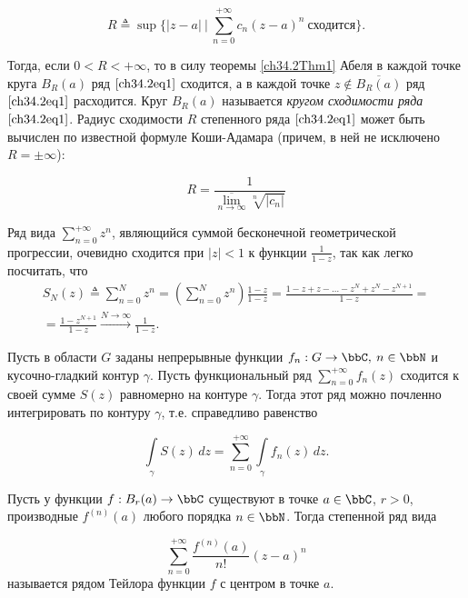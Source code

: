 \begin{equation} \label{ch34.2eq2}
R \triangleq \sup \{ |z - a| \: \big| \: \sum_{n = 0}^{+\infty} c_n (z - a)^n \: \text{сходится} \}.
\end{equation}

Тогда, если $0 < R < +\infty$, то в силу теоремы \ref{ch34.2Thm1} Абеля в каждой точке круга $B_R(a)$ ряд $\eqref{ch34.2eq1}$ сходится, а в каждой точке $z \notin \overline{B_R(a)}$ ряд $\eqref{ch34.2eq1}$ расходится. Круг $B_R(a)$ называется \textit{кругом сходимости ряда} $\eqref{ch34.2eq1}$.
Радиус сходимости $R$ степенного ряда $\eqref{ch34.2eq1}$ может быть вычислен по известной формуле Коши-Адамара (причем, в ней не исключено $R=\pm\infty$):

\begin{equation} \label{ch34.2eq3}
R = \frac{1}{\overline{\lim\limits_{n \to \infty}} \sqrt[n]{|c_n|}}
\end{equation}

\begin{exmpl} \label{exmpl2}
Ряд вида $\sum\limits_{n = 0}^{+\infty} z^n$, являющийся суммой бесконечной геометрической прогрессии, очевидно сходится при $|z| < 1$ к функции $\frac{1}{1 - z}$, так как легко посчитать, что
\begin{multline*}
S_N(z) \triangleq \sum\limits_{n = 0}^{N} z^n = \left( \sum\limits_{n = 0}^{N} z^n \right) \frac{1 - z}{1 - z} =\frac{1-z+z-\dots-z^N+z^N-z^{N+1}}{1-z}=\\= \frac{1 - z^{N + 1}}{1 - z}  \xrightarrow{N \to \infty} \frac{1}{1 - z}.
\end{multline*}

\end{exmpl} 
\begin{stt} \label{ch34stt1000}
Пусть в области $G$ заданы непрерывные функции $f_n: G \to \bbC, \: n \in \bbN$ и кусочно-гладкий контур $\gamma$. Пусть функциональный ряд $\sum\limits_{n = 0}^{+\infty}f_n(z)$ сходится к своей сумме $S(z)$ равномерно на контуре $\gamma$. Тогда этот ряд можно почленно интегрировать по контуру $\gamma$, т.е. справедливо равенство 

\begin{equation} \label{ch34eq1000} 
\int\limits_{\gamma}S(z) \,dz = \sum\limits_{n = 0}^{+\infty} \int\limits_{\gamma} f_n(z) \,dz. 
\end{equation} 

\end{stt}
\begin{defn}
Пусть у функции $f : B_r(a) \to \bbC$ существуют в точке $a \in \bbC$, $r > 0$, производные $f^{(n)}(a)$ любого порядка $n \in \bbN$. Тогда степенной ряд вида

\begin{equation} \label{ch34.2eq4}
\sum\limits_{n = 0}^{+\infty} \frac{f^{(n)}(a)}{n!} (z - a)^n
\end{equation}
называется $\textit{рядом Тейлора функции f}$ с центром в точке $a$.
\end{defn}

